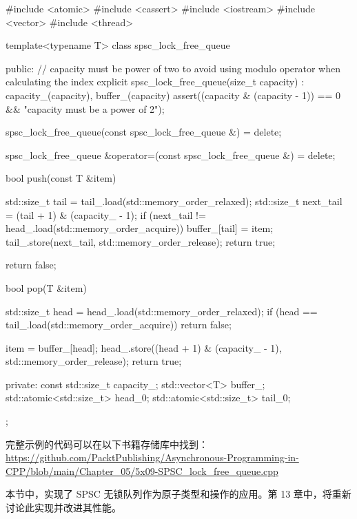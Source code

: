 \begin{cpp}
#include <atomic>
#include <cassert>
#include <iostream>
#include <vector>
#include <thread>

template<typename T>
class spsc_lock_free_queue {
    public:
    // capacity must be power of two to avoid using modulo operator
    when calculating the index
    explicit spsc_lock_free_queue(size_t capacity) : capacity_(capacity), buffer_(capacity) {
        assert((capacity & (capacity - 1)) == 0 && "capacity must be a
        power of 2");
    }

    spsc_lock_free_queue(const spsc_lock_free_queue &) = delete;

    spsc_lock_free_queue &operator=(const spsc_lock_free_queue &) = delete;

    bool push(const T &item) {
        std::size_t tail = tail_.load(std::memory_order_relaxed);
        std::size_t next_tail = (tail + 1) & (capacity_ - 1);
        if (next_tail != head_.load(std::memory_order_acquire)) {
            buffer_[tail] = item;
            tail_.store(next_tail, std::memory_order_release);
            return true;
        }

        return false;
    }

    bool pop(T &item) {
        std::size_t head = head_.load(std::memory_order_relaxed);
        if (head == tail_.load(std::memory_order_acquire)) {
            return false;
        }

        item = buffer_[head];
        head_.store((head + 1) & (capacity_ - 1), std::memory_order_release);
        return true;
    }
private:
    const std::size_t capacity_;
    std::vector<T> buffer_;
    std::atomic<std::size_t> head_{0};
    std::atomic<std::size_t> tail_{0};
};
\end{cpp}

完整示例的代码可以在以下书籍存储库中找到：  \url{https://github.com/PacktPublishing/Asynchronous-Programming-in-CPP/blob/main/Chapter_05/5x09-SPSC_lock_free_queue.cpp}

本节中，实现了 SPSC 无锁队列作为原子类型和操作的应用。第 13 章中，将重新讨论此实现并改进其性能。




